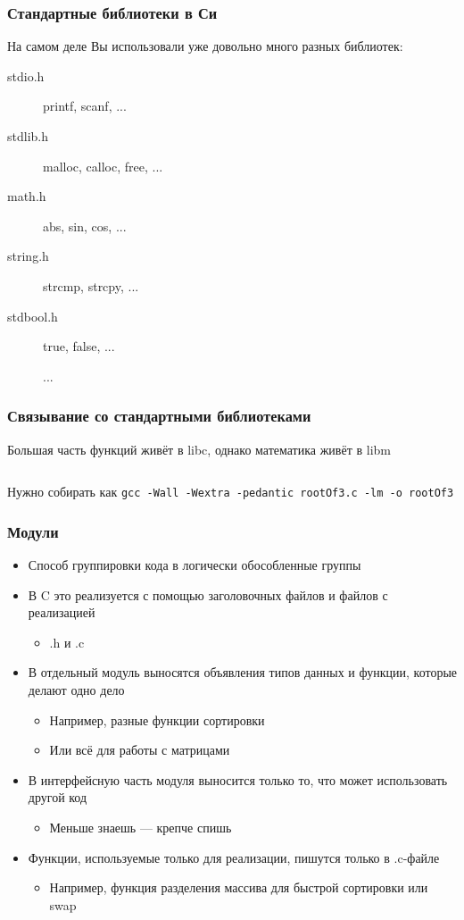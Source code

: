 \documentclass[aspectratio=169]{beamer}
\begin{document}
\begin{frame}
    \frametitle{Стандартные библиотеки в Си}

    На самом деле Вы использовали уже довольно много разных библиотек:
    \begin{description}
        \item[stdio.h] printf, scanf, ...
        \item[stdlib.h] malloc, calloc, free, ...
        \item[math.h] abs, sin, cos, ...
        \item[string.h] strcmp, strcpy, ...
        \item[stdbool.h] true, false, ...
        \item[] ...
    \end{description}

\end{frame}

\begin{frame}[fragile]
    \frametitle{Связывание со стандартными библиотеками}

    Большая часть функций живёт в libc, однако математика живёт в libm
    \inputminted{c}{workdir/rootOf3.C}
    Нужно собирать как \texttt{gcc -Wall -Wextra -pedantic rootOf3.c -lm -o rootOf3}
\end{frame}

\begin{frame}
    \frametitle{Модули}
    \begin{itemize}
        \item Способ группировки кода в логически обособленные группы
        \item В C это реализуется с помощью заголовочных файлов и файлов с реализацией
              \begin{itemize}
                  \item .h и .c
              \end{itemize}
        \item В отдельный модуль выносятся объявления типов данных и функции, которые делают одно дело
              \begin{itemize}
                  \item Например, разные функции сортировки
                  \item Или всё для работы с матрицами
              \end{itemize}
        \item В интерфейсную часть модуля выносится только то, что может использовать другой код
              \begin{itemize}
                  \item Меньше знаешь --- крепче спишь
              \end{itemize}
        \item Функции, используемые только для реализации, пишутся только в .c-файле
              \begin{itemize}
                  \item Например, функция разделения массива для быстрой сортировки или swap
              \end{itemize}
    \end{itemize}
\end{frame}
\end{document}
